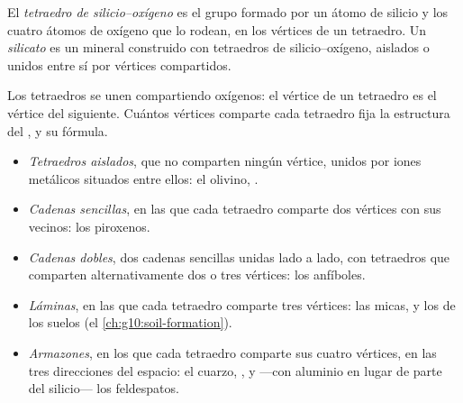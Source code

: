 \begin{definition}\label{def:g11:minerals:silicate}
El \emph{tetraedro de silicio--oxígeno} es
el grupo  formado por un átomo de silicio y los cuatro átomos de
oxígeno que lo rodean, en los vértices de un tetraedro. Un
\emph{silicato} es un mineral construido con tetraedros de
silicio--oxígeno, aislados o unidos entre sí por vértices compartidos.
\end{definition}

Los tetraedros se unen compartiendo oxígenos: el vértice de un tetraedro es el
vértice del siguiente. Cuántos vértices comparte cada tetraedro fija la
estructura del , y su fórmula.
\begin{itemize}
  \item \emph{Tetraedros aislados}, que no comparten ningún vértice, unidos
        por iones metálicos situados entre ellos: el olivino, .
  \item \emph{Cadenas sencillas}, en las que cada tetraedro comparte dos
        vértices con sus vecinos: los piroxenos.
  \item \emph{Cadenas dobles}, dos cadenas sencillas unidas lado a lado, con
        tetraedros que comparten alternativamente dos o tres vértices: los
        anfíboles.
  \item \emph{Láminas}, en las que cada tetraedro comparte tres vértices: las
        micas, y los  de los suelos (el \cref{ch:g10:soil-formation}).
  \item \emph{Armazones}, en los que cada tetraedro comparte sus cuatro
        vértices, en las tres direcciones del espacio: el cuarzo, ,
        y ---con aluminio en lugar de parte del silicio--- los feldespatos.
\end{itemize}

